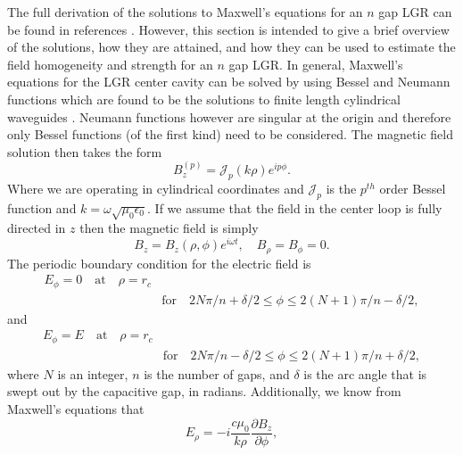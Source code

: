 The full derivation of the solutions to Maxwell's equations for an $n$ gap LGR can be found in references \cite{piasecki1993field, mehdizadeh1989Electromagnetic, mehdizadeh1983investigation}. However, this section is intended to give a brief overview of the solutions, how they are attained, and how they can be used to estimate the field homogeneity and strength for an $n$ gap LGR. In general, Maxwell's equations for the LGR center cavity can be solved by using Bessel and Neumann functions which are found to be the solutions to finite length cylindrical waveguides \cite{gardiol1985open}. Neumann functions however are singular at the origin and therefore only Bessel functions (of the first kind) need to be considered. The magnetic field solution then takes the form
\begin{equation} \label{solution1}
B_z^{(p)} = \mathcal{J}_p(k\rho) e^{i p \phi}.
\end{equation}
Where we are operating in cylindrical coordinates and $\mathcal{J}_p$ is the $p^{th}$ order Bessel function and $k = \omega \sqrt{\mu_0\epsilon_0}$. If we assume that the field in the center loop is fully directed in $z$ then the magnetic field is simply
\begin{equation}\label{boundary1}
B_z = B_z(\rho,\phi)e^{i\omega t}, \quad B_{\rho} = B_{\phi} = 0.
\end{equation} 
The periodic boundary condition for the electric field is
\begin{equation}\label{maxwell1}
\begin{split}
E_\phi = 0 \quad \text{at} \quad \rho = r_c \\
& \text{for} \quad 2N\pi/n + \delta/2 \leqslant \phi \leqslant 2(N+1)\pi/n-\delta/2,
\end{split}
\end{equation}
and
\begin{equation}\label{maxwell2}
\begin{split}
E_\phi = E \quad \text{at} \quad \rho = r_c \\
& \text{for} \quad 2N\pi/n - \delta/2 \leqslant \phi \leqslant 2(N+1)\pi/n+\delta/2,
\end{split}
\end{equation}
where $N$ is an integer, $n$ is the number of gaps, and $\delta$ is the arc angle that is swept out by the capacitive gap, in radians. Additionally, we know from Maxwell's equations that
\begin{equation}\label{boundary2}
E_{\rho} = -i\frac{c \mu_0}{k \rho}\frac{\partial B_z}{\partial \phi},
\end{equation}
